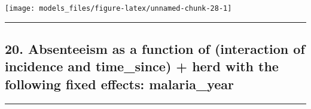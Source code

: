 \documentclass[]{article}
\begin{document}
\begin{center}\texttt{[image: models\_files/figure-latex/unnamed-chunk-28-1]} \end{center}

\newpage

\begin{center}\rule{0.5\linewidth}{\linethickness}\end{center}

\subsection{20. Absenteeism as a function of (interaction of incidence
and time\_since) + herd with the following fixed effects:
malaria\_year}\label{absenteeism-as-a-function-of-interaction-of-incidence-and-time_since-herd-with-the-following-fixed-effects-malaria_year}

\begin{center}\rule{0.5\linewidth}{\linethickness}\end{center}
\end{document}
